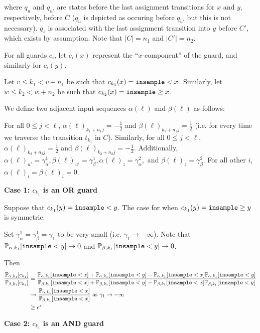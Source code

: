 where $q_u$ and $q_{u'}$ are states before the last assignment transitions for $x$ and $y$, respectively, before $C$ ($q_u$ is depicted as occuring before $q_{u'}$ but this is not necessary). $q_z$ is associated with the last assignment transition into $y$ before $C'$, which exists by assumption. Note that $|C| = n_1$ and $|C'| = n_2$.

For all guards $c_i$, let $c_i(x)$ represent the ``$x$-component'' of the guard, and similarly for $c_i(y)$.

Let $v\leq k_1< v+n_1$ be such that $c_{k_1}(x) = \lguard[x]$. Similarly, let $w \leq k_2 < w+n_2$ be such that $c_{k_2}(x) = \gguard[x]$.


We define two adjacent input sequences $\alpha(\ell)$ and $\beta(\ell)$ as follows:

For all $0\leq j < \ell$, $\alpha(\ell)_{k_1+n_1j} = -\frac{1}{2}$ and $\beta(\ell)_{k_1+n_1j} = \frac{1}{2}$ (i.e. for every time we traverse the transition $t_{k_1}$ in $C$). Similarly, for all $0\leq j < \ell$, $\alpha(\ell)_{k_2+n_2j} = \frac{1}{2}$ and $\beta(\ell)_{k_2+n_2j} = -\frac{1}{2}$. 
Additionally, $\alpha(\ell)_{u'} = \gamma_\alpha^1, \beta(\ell)_{u'} = \gamma_\beta^1, \alpha(\ell)_{z} = \gamma_\alpha^2,$ and $\beta(\ell)_z = \gamma_\beta^2$. For all other $i$, $\alpha(\ell)_i =\beta(\ell)_i= 0$.


\textbf{Case 1: $c_{k_1}$ is an OR guard}

Suppose that $c_{k_1}(y) = \lguard[y]$. The case for when $c_{k_1}(y) = \gguard[y]$ is symmetric.

Set $\gamma_\alpha^1=\gamma_\beta^1=\gamma_1$ to be very small (i.e. $\gamma_1\to-\infty$). Note that $\PP_{\alpha, k_1}[\lguard[y]]\to 0$ and $\PP_{\beta, k_1}[\lguard[y]] \to 0$. 

Then \begin{align*}
    \frac{\PP_{\alpha, k_1}[c_{k_1}]}{\PP_{\beta, k_1}[c_{k_1}]} &= \frac{\PP_{\alpha, k_1}[\lguard[x]] + \PP_{\alpha, k_1}[\lguard[y]]- \PP_{\alpha, k_1}[\lguard[x]]\PP_{\alpha, k_1}[\lguard[y]]}{\PP_{\beta, k_1}[\lguard[x]] + \PP_{\beta, k_1}[\lguard[y]]- \PP_{\beta, k_1}[\lguard[x]]\PP_{\beta, k_1}[\lguard[y]]}\\
	&\to  \frac{\PP_{\alpha, k_1}[\lguard[x]]}{\PP_{\beta, k_1}[\lguard[x]]}\text{ as }\gamma_1 \to -\infty\\
	&\geq e^\varepsilon
\end{align*}

\textbf{Case 2: $c_{k_1}$ is an AND guard}

